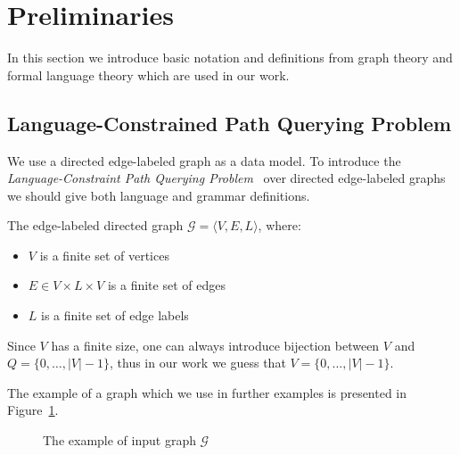 \section{Preliminaries}

In this section we introduce basic notation and definitions from graph theory and formal language theory which are used in our work.

\subsection{Language-Constrained Path Querying Problem}

We use a directed edge-labeled graph as a data model. 
To introduce the \textit{Language-Constraint Path Querying Problem}~\cite{!!!} over directed edge-labeled graphs we should give both language and grammar definitions.

\begin{definition}
The edge-labeled directed graph $\mathcal{G} = \langle V,E,L \rangle$, where:
\begin{itemize}
    \item $V$ is a finite set of vertices
    \item $E \in V \times L \times V$ is a finite set of edges
    \item $L$ is a finite set of edge labels
\end{itemize}
\end{definition}

Since $V$ has a finite size, one can always introduce bijection between $V$ and $Q = \{0, \ldots, |V|-1\}$, thus in our work we guess that $V = \{0, \ldots, |V|-1\}$.

The example of a graph which we use in further examples is presented in Figure~\ref{fig:example_input_graph}.

\begin{figure}[h]
    \centering        
    \caption{The example of input graph $\mathcal{G}$}
    \label{fig:example_input_graph}
\end{figure}


